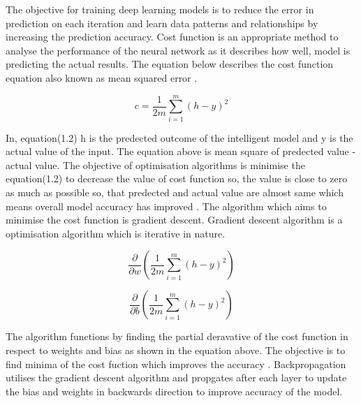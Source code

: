 The objective for training deep learning models is to reduce
the error in prediction on each iteration and 
learn data patterns and relationships by increasing the 
prediction accuracy. Cost function is an appropriate method to 
analyse the performance of the neural network as it describes 
how well, model is predicting the actual results. The equation below 
describes the cost function equation also known as mean squared error \citep{7013173}.
\vspace{2mm}

\begin{center}
\begin{equation}
    c = \frac{1}{2m} \sum_{i=1}^m(h - y)^2
\end{equation}
\end{center}

In, equation(1.2)  h is the predected outcome of the intelligent model 
and y is the actual value of the input. The equation above is mean square of 
predected value - actual value. The objective of optimisation algorithms is 
minimise the equation(1.2) to decrease the value of cost function so, the value is 
close to zero as much as possible so, that predected and actual 
value are almost same which means overall model accuracy has improved \citep{7013173}.
The algorithm which aims to minimise the cost function is gradient descent. Gradient descent algorithm 
is a optimisation algorithm which is iterative in nature. 

\begin{center}
    \begin{equation}
            \frac{\partial }{\partial w} (\frac{1}{2m} \sum_{i=1}^m(h - y)^2)
    \end{equation}

    \begin{equation}
        \frac{\partial }{\partial b} (\frac{1}{2m} \sum_{i=1}^m(h - y)^2) 
    \end{equation}
\end{center}


The algorithm functions by finding the 
partial deravative of the cost function in respect to weights and bias as shown in the equation above.
The objective is to find minima of the cost fuction which improves the accuracy \citep{7013173}. 
Backpropagation utilises the gradient descent algorithm and propgates after each layer to 
update the bias and weights in backwards direction to improve accuracy of the model. 